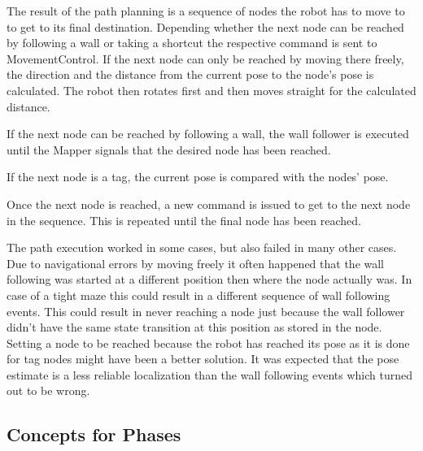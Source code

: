 The result of the path planning is a sequence of nodes the robot has to move to to get to its final destination.
Depending whether the next node can be reached by following a wall or taking a shortcut the respective command is sent to MovementControl.
If the next node can only be reached by moving there freely, the direction and the distance from the current pose to the node's pose is calculated. The robot then rotates first and then moves straight for the calculated distance. 

If the next node can be reached by following a wall, the wall follower is executed until the Mapper signals that the desired node has been reached.

If the next node is a tag, the current pose is compared with the nodes' pose.

Once the next node is reached, a new command is issued to get to the next node in the sequence. This is repeated until the final node has been reached.

The path execution worked in some cases, but also failed in many other cases. Due to navigational errors by moving freely it often happened that the wall following was started at a different position then where the node actually was. In case of a tight maze this could result in a different sequence of wall following events. This could result in never reaching a node just because the wall follower didn't have the same state transition at this position as stored in the node. Setting a node to be reached because the robot has reached its pose as it is done for tag nodes might have been a better solution. It was expected that the pose estimate is a less reliable localization than the wall following events which turned out to be wrong.    


\subsection{Concepts for Phases}
\label{subsec:conceptsStrategies}
